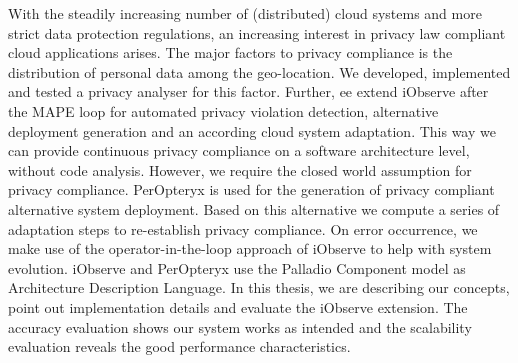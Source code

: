 
\Abstract

With the steadily increasing number of (distributed) cloud systems and more strict data protection regulations, an increasing interest in privacy law compliant cloud applications arises. The major factors to privacy compliance is the distribution of personal data among the geo-location. We developed, implemented and tested a privacy analyser for this factor. Further, ee extend iObserve after the MAPE loop for automated privacy violation detection, alternative deployment generation and an according cloud system adaptation. This way we can provide continuous privacy compliance on a software architecture level, without code analysis. However, we require the closed world assumption for privacy compliance. PerOpteryx is used for the generation of privacy compliant alternative system deployment. Based on this alternative we compute a series of adaptation steps to re-establish privacy compliance. On error occurrence, we make use of the operator-in-the-loop approach of iObserve to help with system evolution. iObserve and PerOpteryx use the Palladio Component model as Architecture Description Language. In this thesis, we are describing our concepts, point out implementation details and evaluate the iObserve extension. The accuracy evaluation shows our system works as intended and the scalability evaluation reveals the good performance characteristics.